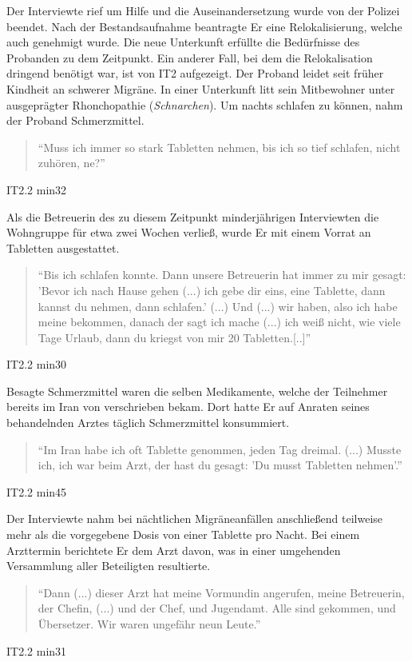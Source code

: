 Der Interviewte rief um Hilfe und die Auseinandersetzung wurde von der Polizei beendet.  Nach der Bestandsaufnahme beantragte Er eine Relokalisierung, welche auch genehmigt wurde. Die neue Unterkunft erfüllte die Bedürfnisse des Probanden zu dem Zeitpunkt.\newline
Ein anderer Fall, bei dem die Relokalisation dringend benötigt war, ist von IT2 aufgezeigt. Der Proband leidet seit früher Kindheit an schwerer Migräne. In einer Unterkunft litt sein Mitbewohner unter ausgeprägter Rhonchopathie (\textit{Schnarchen}). Um nachts schlafen zu können, nahm der Proband Schmerzmittel.
\begin{quote}
    ``Muss ich immer so stark Tabletten nehmen, bis ich so tief schlafen, nicht zuhören, ne?''
\end{quote}
\caption{IT2.2 min32}
Als die Betreuerin des zu diesem Zeitpunkt minderjährigen Interviewten die Wohngruppe für etwa zwei Wochen verließ, wurde Er mit einem Vorrat an Tabletten ausgestattet.\newline
\begin{quote}
    ``Bis ich schlafen konnte. Dann unsere Betreuerin hat immer zu mir gesagt: 'Bevor ich nach Hause gehen (...) ich gebe dir eins, eine Tablette, dann kannst du nehmen, dann schlafen.' (...) Und (...) wir haben, also ich habe meine bekommen, danach der sagt ich mache (...) ich weiß nicht, wie viele Tage Urlaub, dann du kriegst von mir 20 Tabletten.[..]''
\end{quote}
\caption{IT2.2 min30}
Besagte Schmerzmittel waren die selben Medikamente, welche der Teilnehmer bereits im Iran von verschrieben bekam. Dort hatte Er auf Anraten seines behandelnden Arztes täglich Schmerzmittel konsummiert.
\begin{quote}
    ``Im Iran habe ich oft Tablette genommen, jeden Tag dreimal. (...) Musste ich, ich war beim Arzt, der hast du gesagt: 'Du musst Tabletten nehmen'.''
\end{quote}
\caption{IT2.2 min45}
Der Interviewte nahm bei nächtlichen Migräneanfällen anschließend teilweise mehr als die vorgegebene Dosis von einer Tablette pro Nacht. Bei einem Arzttermin berichtete Er dem Arzt davon, was in einer umgehenden Versammlung aller Beteiligten resultierte.
\begin{quote}
    ``Dann (...) dieser Arzt hat meine Vormundin angerufen, meine Betreuerin, der Chefin, (...) und der Chef, und Jugendamt. Alle sind gekommen, und Übersetzer. Wir waren ungefähr neun Leute.''
\end{quote}
\caption{IT2.2 min31}
